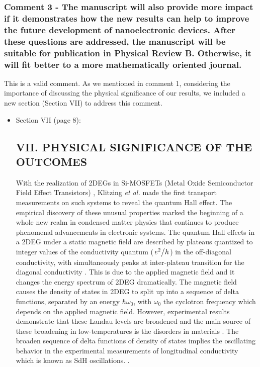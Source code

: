 \documentclass{article}
\begin{document}
\subsubsection*{Comment 3 -
\color{RoyalBlue} The manuscript will also provide more impact if it demonstrates how the new results can help to improve the future development of nanoelectronic devices. After these questions are addressed, the manuscript will be suitable for publication in Physical Review B. Otherwise, it will fit better to a more mathematically oriented journal.
}

This is a valid comment. As we mentioned in comment 1, considering the importance of discussing the physical significance of our results, we included a new section (Section VII) to address this comment.

\begin{itemize}
  \item Section VII (page 8):\\
  {\color{Red}
  \subsection*{VII. PHYSICAL SIGNIFICANCE OF THE OUTCOMES}

  With the realization of 2DEGs in Si-MOSFETs (Metal Oxide Semiconductor Field Effect Transistors) \citep{fowler66}, Klitzing \textit{et al.} \cite{klitzing80} made the first transport measurements on such systems to reveal the quantum Hall effect. The empirical discovery of these unusual properties marked the beginning of a whole new realm in condensed matter physics that continues to produce phenomenal advancements in electronic systems. The quantum Hall effects in a 2DEG under a static magnetic field are described by plateaus quantized to integer values of the conductivity quantum ($\flatfrac{e^2}{\hbar}$) in the off-diagonal conductivity, with simultaneously peaks at inter-plateau transition for the diagonal conductivity \cite{endo09}. This is due to the applied magnetic field and it changes the energy spectrum of 2DEG dramatically. The magnetic field causes the density of states in 2DEG to split up into a sequence of delta functions, separated by an energy $\hbar\omega_0$, with $\omega_0$ the cyclotron frequency which depends on the applied magnetic field.
  However, experimental results demonstrate that these Landau levels are broadened and the main source of these broadening in low-temperatures is the disorders in materials \cite{ando85,dial07}. The broaden sequence of delta functions of density of states implies the oscillating behavior in the experimental measurements of longitudinal conductivity which is known as SdH oscillations. \cite{endo09,wakabayashi78}.

}
\end{itemize}
\end{document}
